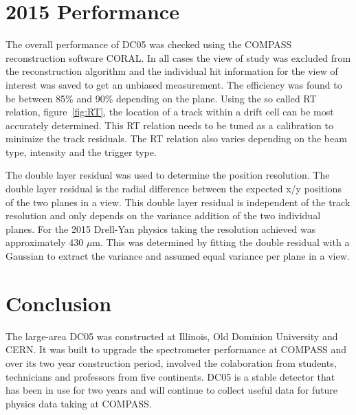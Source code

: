 \section{2015 Performance}
The overall performance of DC05 was checked using the COMPASS reconstruction
software CORAL.  In all cases the view of study was excluded from the
reconstruction algorithm and the individual hit information for the view of
interest was saved to get an unbiased measurement.  The efficiency was found to
be between 85\% and 90\% depending on the plane.  Using the so called RT
relation, figure~\ref{fig:RT}, the location of a track within a drift cell can
be most accurately determined.  This RT relation needs to be tuned as a
calibration to minimize the track residuals.  The RT relation also varies
depending on the beam type, intensity and the trigger type.  \par The double
layer residual was used to determine the position resolution.  The double layer
residual is the radial difference between the expected x/y positions of the two
planes in a view.  This double layer residual is independent of the track
resolution and only depends on the variance addition of the two individual
planes.  For the 2015 Drell-Yan physics taking the resolution achieved was
approximately 430 $\mu$m. This was determined by fitting the double residual
with a Gaussian to extract the variance and assumed equal variance per plane in
a view.


\section{Conclusion}
The large-area DC05 was constructed at Illinois, Old Dominion University and
CERN.  It was built to upgrade the spectrometer performance at COMPASS and over
its two year construction period, involved the colaboration from students,
technicians and professors from five continents.  DC05 is a stable detector that
has been in use for two years and will continue to collect useful data for
future physics data taking at COMPASS.
